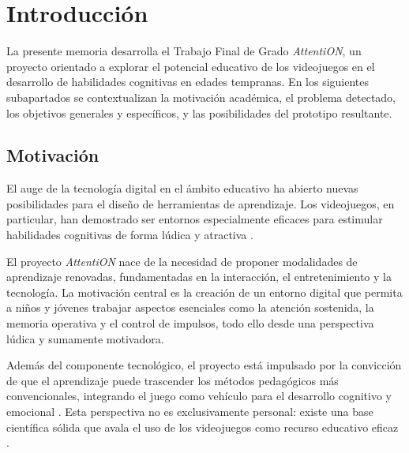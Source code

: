 \documentclass[12pt, a4paper]{report}
\begin{document}

\tableofcontents

\clearpage

\chapter{Introducción}

La presente memoria desarrolla el Trabajo Final de Grado \textit{AttentiON},
un proyecto orientado a explorar el potencial educativo de los videojuegos
en el desarrollo de habilidades cognitivas en edades tempranas. En los
siguientes subapartados se contextualizan la motivación académica, el
problema detectado, los objetivos generales y específicos, y las posibilidades
del prototipo resultante.

\section{Motivación}

El auge de la tecnología digital en el ámbito educativo ha abierto nuevas
posibilidades para el diseño de herramientas de aprendizaje. Los videojuegos,
en particular, han demostrado ser entornos especialmente eficaces para estimular
habilidades cognitivas de forma lúdica y atractiva \citep{Gee2003,Connolly2012}.

El proyecto \textit{AttentiON} nace de la necesidad de proponer modalidades de
aprendizaje renovadas, fundamentadas en la interacción, el entretenimiento y la
tecnología. La motivación central es la creación de un entorno digital que permita
a niños y jóvenes trabajar aspectos esenciales como la atención sostenida, la
memoria operativa y el control de impulsos, todo ello desde una perspectiva lúdica
y sumamente motivadora.

Además del componente tecnológico, el proyecto está impulsado por la convicción de
que el aprendizaje puede trascender los métodos pedagógicos más convencionales,
integrando el juego como vehículo para el desarrollo cognitivo y emocional
\citep{Granic2014}. Esta perspectiva no es exclusivamente personal: existe una
base científica sólida que avala el uso de los videojuegos como recurso educativo
eficaz \citep{Bediou2018,Powers2013}.
\end{document}
